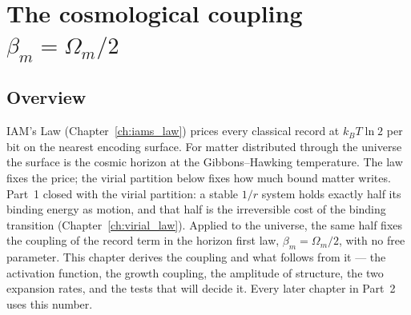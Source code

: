 \providecommand{\authorhold}[1]{\par\smallskip\noindent\fbox{\parbox{0.95\linewidth}{\small\textbf{Author hold.} #1}}\par\smallskip}

\chapter{The cosmological coupling $\beta_m=\Omega_m/2$}\label{ch:virial}

\section*{Overview}
IAM's Law (Chapter~\ref{ch:iams_law}) prices every classical record at $k_BT\ln2$ per bit on the nearest encoding surface. For matter
distributed through the universe the surface is the cosmic horizon at the Gibbons--Hawking temperature. The law fixes the price; the virial
partition below fixes how much bound matter writes.
Part~1 closed with the virial partition: a stable $1/r$ system holds exactly half its binding energy as motion, and that half is the irreversible cost of the
binding transition (Chapter~\ref{ch:virial_law}). Applied to the universe, the same half fixes the coupling of the record term in the horizon first law,
$\beta_m=\Omega_m/2$, with no free parameter. This chapter derives the coupling and what follows from it --- the activation function, the growth coupling,
the amplitude of structure, the two expansion rates, and the tests that will decide it. Every later chapter in Part~2 uses this number.

